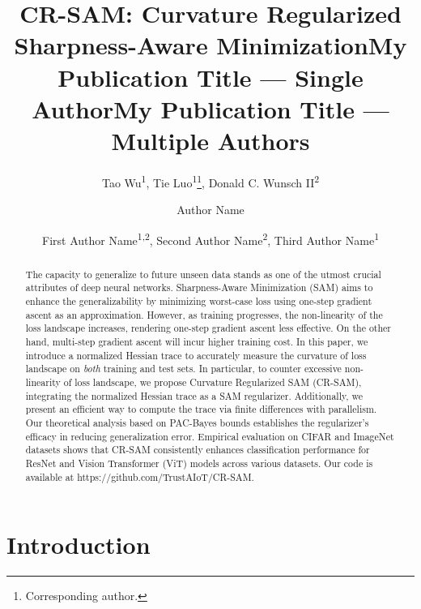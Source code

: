 \documentclass[letterpaper]{article} %
\title{CR-SAM: Curvature Regularized Sharpness-Aware Minimization}
\author{
    Tao Wu\textsuperscript{\rm 1},
    Tie Luo\textsuperscript{\rm 1}\thanks{Corresponding author.},
    Donald C. Wunsch II\textsuperscript{\rm 2}
}
\title{My Publication Title --- Single Author}
\author {
    Author Name
}
\title{My Publication Title --- Multiple Authors}
\author {
    First Author Name\textsuperscript{\rm 1,\rm 2},
    Second Author Name\textsuperscript{\rm 2},
    Third Author Name\textsuperscript{\rm 1}
}
\theoremstyle{plain}
\theoremstyle{definition}
\begin{document}
\maketitle

\begin{abstract}
The capacity to generalize to future unseen data stands as one of the utmost crucial attributes of deep neural networks. Sharpness-Aware Minimization (SAM) aims to enhance the generalizability by minimizing worst-case loss using one-step gradient ascent as an approximation. However, as training progresses, the non-linearity of the loss landscape increases, rendering one-step gradient ascent less effective. On the other hand, multi-step gradient ascent will incur higher training cost. In this paper, we introduce a normalized Hessian trace to accurately measure the curvature of loss landscape on {\em both} training and test sets. In particular, to counter excessive non-linearity of loss landscape, we propose Curvature Regularized SAM (CR-SAM), integrating the normalized Hessian trace as a SAM regularizer. Additionally, we present an efficient way to compute the trace via finite differences with parallelism. Our theoretical analysis based on PAC-Bayes bounds establishes the regularizer's efficacy in reducing generalization error. Empirical evaluation on CIFAR and ImageNet datasets shows that CR-SAM consistently enhances classification performance for ResNet and Vision Transformer (ViT) models across various datasets. Our code is available at https://github.com/TrustAIoT/CR-SAM.
\end{abstract}

\section{Introduction}
\label{sec:Introduction}
\end{document}
